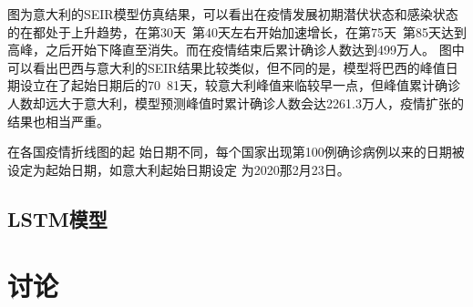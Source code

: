 \documentclass[lang=cn,11pt,a4paper,cite=authoryear]{elegantpaper}
\begin{document}
图为意大利的SEIR模型仿真结果，可以看出在疫情发展初期潜伏状态和感染状态的在都处于上升趋势，在第30天~第40天左右开始加速增长，在第75天~第85天达到高峰，之后开始下降直至消失。而在疫情结束后累计确诊人数达到499万人。
图中可以看出巴西与意大利的SEIR结果比较类似，但不同的是，模型将巴西的峰值日期设立在了起始日期后的70~81天，较意大利峰值来临较早一点，但峰值累计确诊人数却远大于意大利，模型预测峰值时累计确诊人数会达2261.3万人，疫情扩张的结果也相当严重。






在各国疫情折线图的起
始日期不同，每个国家出现第100例确诊病例以来的日期被设定为起始日期，如意大利起始日期设定
为2020那2月23日。

\subsection{LSTM模型}

\section{讨论}


\end{document}
